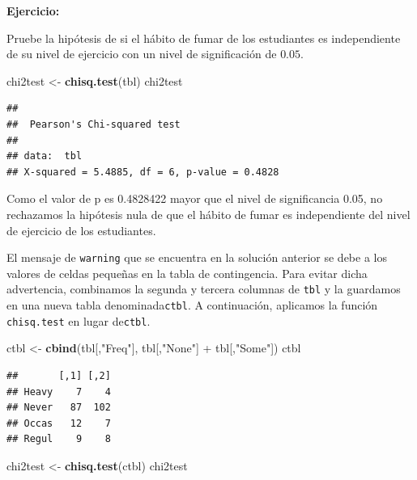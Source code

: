 \documentclass[]{article}
\newenvironment{Shaded}{\begin{snugshade}}{\end{snugshade}}
\newcommand{\KeywordTok}[1]{\textcolor[rgb]{0.13,0.29,0.53}{\textbf{{#1}}}}
\newcommand{\StringTok}[1]{\textcolor[rgb]{0.31,0.60,0.02}{{#1}}}
\newcommand{\NormalTok}[1]{{#1}}
\numberwithin{equation}{section}
\begin{document}
\textbf{Ejercicio:}

Pruebe la hipótesis de si el hábito de fumar de los estudiantes es
independiente de su nivel de ejercicio con un nivel de significación de
\(0.05\).

\begin{Shaded}
\begin{Highlighting}[]
\NormalTok{chi2test <-}\StringTok{ }\KeywordTok{chisq.test}\NormalTok{(tbl) }
\NormalTok{chi2test}
\end{Highlighting}
\end{Shaded}

\begin{verbatim}
## 
##  Pearson's Chi-squared test
## 
## data:  tbl
## X-squared = 5.4885, df = 6, p-value = 0.4828
\end{verbatim}

Como el valor de p es 0.4828422 mayor que el nivel de significancia
0.05, no rechazamos la hipótesis nula de que el hábito de fumar es
independiente del nivel de ejercicio de los estudiantes.

El mensaje de \texttt{warning} que se encuentra en la solución anterior
se debe a los valores de celdas pequeñas en la tabla de contingencia.
Para evitar dicha advertencia, combinamos la segunda y tercera columnas
de \texttt{tbl} y la guardamos en una nueva tabla
denominada\texttt{ctbl}. A continuación, aplicamos la función
\texttt{chisq.test} en lugar de\texttt{ctbl}.

\begin{Shaded}
\begin{Highlighting}[]
\NormalTok{ctbl <-}\StringTok{ }\KeywordTok{cbind}\NormalTok{(tbl[,}\StringTok{"Freq"}\NormalTok{], tbl[,}\StringTok{"None"}\NormalTok{] +}\StringTok{ }\NormalTok{tbl[,}\StringTok{"Some"}\NormalTok{])}
\NormalTok{ctbl}
\end{Highlighting}
\end{Shaded}

\begin{verbatim}
##       [,1] [,2]
## Heavy    7    4
## Never   87  102
## Occas   12    7
## Regul    9    8
\end{verbatim}

\begin{Shaded}
\begin{Highlighting}[]
\NormalTok{chi2test <-}\StringTok{ }\KeywordTok{chisq.test}\NormalTok{(ctbl)}
\NormalTok{chi2test}
\end{Highlighting}
\end{Shaded}
\end{document}
